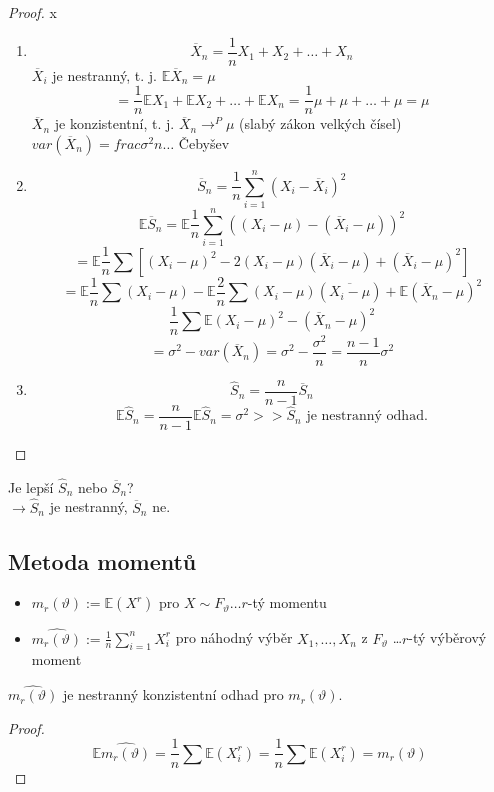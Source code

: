 \documentclass[../main.tex]{subfiles}
\begin{document}
\begin{proof}
{\color{white} x}
\begin{enumerate}
    \item
    \[\overline{X}_n = \frac{1}{n} X_1 + X_2 + \dots + X_n\]
    $\overline{X}_i$ je nestranný, t. j. $\mathbb{E}\overline{X}_n = \mu$
    \[ = \frac{1}{n} \mathbb{E}X_1 + \mathbb{E}X_2 + \dots + \mathbb{E}X_n = \frac{1}{n} \mu + \mu + \dots + \mu = \mu\]
    $\overline{X}_n$ je konzistentní, t. j. $\overline{X}_n \rightarrow^P \mu$ (slabý zákon velkých čísel) \\
    $var(\overline{X}_n) = frac{\sigma^2}{n} \dots$ Čebyšev
    \item
    \[\overline{S}_n = \frac{1}{n} \sum^n_{i=1}(X_i - \overline{X}_i)^2\]
    \[\mathbb{E}\overline{S}_n = \mathbb{E}\frac{1}{n}\sum^n_{i=1}((X_i - \mu) - (\overline{X}_i - \mu))^2\]
    \[ = \mathbb{E}\frac{1}{n}\sum\left[(X_i - \mu)^2 - 2(X_i - \mu)(\overline{X}_i-\mu) + (\overline{X}_i - \mu)^2\right]\]
    \[ = \mathbb{E}\frac{1}{n}\sum(X_i - \mu) - \mathbb{E} \frac{2}{n} \sum (X_i - \mu)(\overline{X_i-\mu}) + \mathbb{E}(\overline{X}_n - \mu)^2\]
    \[ \frac{1}{n} \sum \mathbb{E}(X_i - \mu)^2 - \mathbb{} (\overline{X}_n - \mu)^2\]
    \[ = \sigma^2 - var(\overline{X}_n) = \sigma^2 - \frac{\sigma^2}{n} = \frac{n-1}{n}\sigma^2\]
    \item
    \[\widehat{S}_n = \frac{n}{n-1}\overline{S}_n\]
    \[\mathbb{E}\widehat{S}_n = \frac{n}{n-1}\mathbb{E}\widehat{S}_n = \sigma^2 >> \widehat{S}_n \text{ je nestranný odhad.}\]
\end{enumerate}
\end{proof}

Je lepší $\widehat{S}_n$ nebo $\overline{S}_n$?\\
$\rightarrow \widehat{S}_n$ je nestranný, $\overline{S}_n$ ne.\\

\subsection{Metoda momentů}
\begin{itemize}
    \item $m_r(\vartheta) := \mathbb{E}(X^r)$ pro $X \sim F_\vartheta \dots r$-tý momentu
    \item $\widehat{m_r(\vartheta)}:= \frac{1}{n} \sum^n_{i=1}X^r_i$ pro náhodný výběr $X_1,\dots,X_n$ z $F_\vartheta$ \dots $r$-tý výběrový moment
\end{itemize}
\begin{theorem}
    $\widehat{m_r(\vartheta)}$ je nestranný konzistentní odhad pro $m_r(\vartheta)$.
\end{theorem}
\begin{proof}
    \[\mathbb{E}\widehat{m_r(\vartheta)} = \frac{1}{n} \sum \mathbb{E}(X^r_i) = \frac{1}{n}\sum \mathbb{E}(X^r_i) = m_r(\vartheta)\]
\end{proof}
\end{document}
